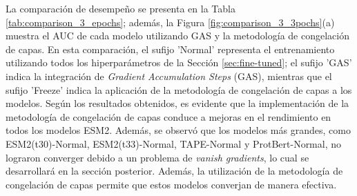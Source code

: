 La comparación de desempeño se presenta en la Tabla \ref{tab:comparison_3_epochs}; además, la Figura \ref{fig:comparison_3_3pochs}(a) muestra el AUC de cada modelo utilizando GAS y la metodología de congelación de capas. En esta comparación, el sufijo 'Normal' representa el entrenamiento  utilizando todos los hiperparámetros de la Sección \ref{sec:fine-tuned}; el sufijo 'GAS' indica la integración de \textit{Gradient Accumulation Steps} (GAS), mientras que el sufijo 'Freeze' indica la aplicación de la metodología de congelación de capas a los modelos. Según los resultados obtenidos, es evidente que la implementación de la metodología de congelación de capas conduce a mejoras en el rendimiento en todos los modelos ESM2. Además, se observó que los modelos más grandes, como ESM2(t30)-Normal, ESM2(t33)-Normal, TAPE-Normal y ProtBert-Normal, no lograron converger debido a un problema de \textit{vanish gradients}, lo cual se desarrollará en la sección posterior. Además, la utilización de la metodología de congelación de capas permite que estos modelos converjan de manera efectiva.

